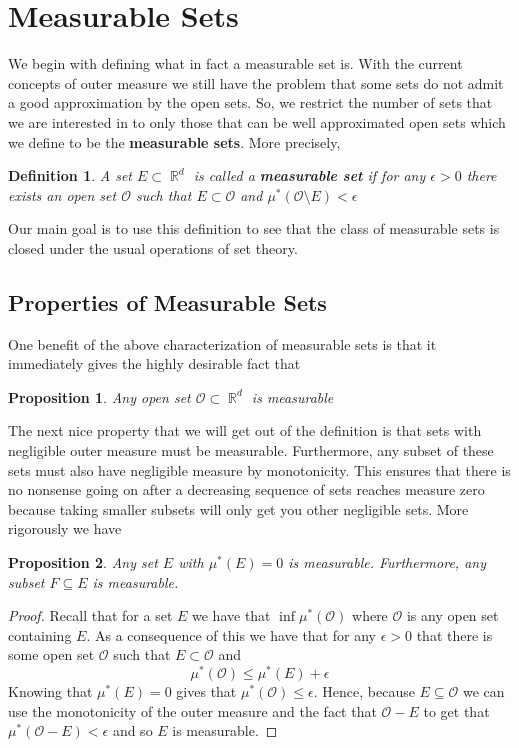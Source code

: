 \documentclass{article}
\DeclareMathOperator{\R}{\mathbb{R}}
\newtheorem*{defn}{Definition}
\newtheorem*{prop}{Proposition}
\begin{document}
\section{Measurable Sets}
We begin with defining what in fact a measurable set is. With the current concepts of outer measure we still have the problem that some sets do not admit a good approximation by the open sets. So, we restrict the number of sets that we are interested in to only those that can be well approximated open sets which we define to be the {\bf measurable sets}. More precisely, \\

\begin{defn}
A set $E\subset \R^d$ is called a {\bf measurable set} if for any $\epsilon > 0$ there exists an open set $\mathcal{O}$ such that $E \subset \mathcal{O}$ and $\mu^*(\mathcal{O}\setminus E) < \epsilon$
\end{defn}
Our main goal is to use this definition to see that the class of measurable sets is closed under the usual operations of set theory.

\subsection{Properties of Measurable Sets}
One benefit of the above characterization of measurable sets is that it immediately gives the highly desirable  fact that \\

\begin{prop}
Any open set $\mathcal{O} \subset \R^d$ is measurable
\end{prop}
The next nice property that we will get out of the definition is that sets with negligible outer measure must be measurable. Furthermore, any subset of these sets must also have negligible measure by monotonicity. This ensures that there is no nonsense going on after a decreasing sequence of sets reaches measure zero because taking smaller subsets will only get you other negligible sets. More rigorously we have \\

\begin{prop}
Any set $E$ with $\mu^*(E) = 0$ is measurable. Furthermore, any subset $F \subseteq E$ is measurable.
\end{prop}
\begin{proof}
Recall that for a set $E$ we have that $\inf\mu^*(\mathcal{O})$ where $\mathcal{O}$ is any open set containing $E$. As a consequence of this we have that for any $\epsilon > 0$ that there is some open set $\mathcal{O}$ such that $E \subset \mathcal{O}$ and 
\[
\mu^*(\mathcal{O}) \leq \mu^*(E) + \epsilon
\]
Knowing that $\mu^*(E) = 0$ gives that $\mu^*(\mathcal{O}) \leq \epsilon$. Hence, because $E \subseteq \mathcal{O}$ we can use the monotonicity of the outer measure and the fact that $\mathcal{O} - E$ to get that $\mu^*(\mathcal{O} - E) < \epsilon$ and so $E$ is measurable. 
\end{proof}
\end{document}
